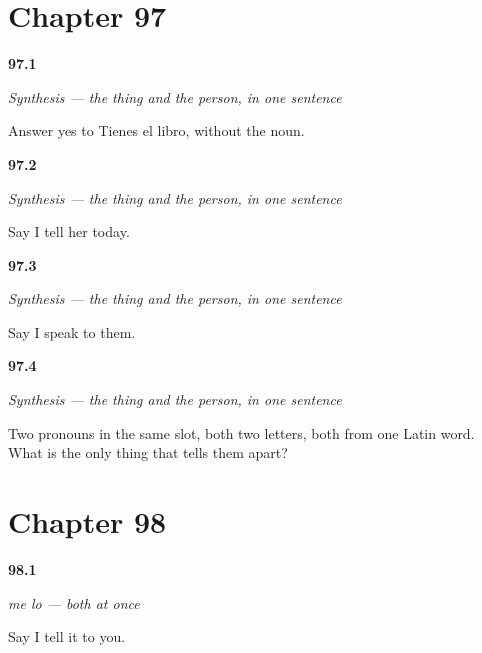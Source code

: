 \section*{Chapter 97}

\noindent\begin{minipage}[t]{\linewidth}
\raggedright
\hypertarget{review-ES-C46-sintesis-dar-y-decir-book}{\textbf{97.1}} \emph{Synthesis — the thing and the person, in one sentence}\par
\small Answer yes to Tienes el libro, without the noun.
\end{minipage}\par\medskip

\noindent\begin{minipage}[t]{\linewidth}
\raggedright
\hypertarget{review-ES-C46-sintesis-dar-y-decir-person}{\textbf{97.2}} \emph{Synthesis — the thing and the person, in one sentence}\par
\small Say I tell her today.
\end{minipage}\par\medskip

\noindent\begin{minipage}[t]{\linewidth}
\raggedright
\hypertarget{review-ES-C46-sintesis-dar-y-decir-plural}{\textbf{97.3}} \emph{Synthesis — the thing and the person, in one sentence}\par
\small Say I speak to them.
\end{minipage}\par\medskip

\noindent\begin{minipage}[t]{\linewidth}
\raggedright
\hypertarget{review-ES-C46-sintesis-dar-y-decir-what}{\textbf{97.4}} \emph{Synthesis — the thing and the person, in one sentence}\par
\small Two pronouns in the same slot, both two letters, both from one Latin word. What is the only thing that tells them apart?
\end{minipage}\par\medskip

\section*{Chapter 98}

\noindent\begin{minipage}[t]{\linewidth}
\raggedright
\hypertarget{review-ES-C47-me-lo-say}{\textbf{98.1}} \emph{me lo — both at once}\par
\small Say I tell it to you.
\end{minipage}\par\medskip

